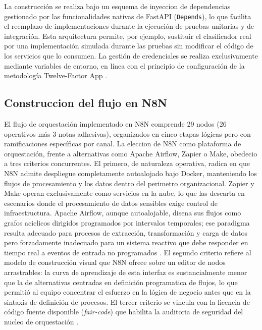 La construcción se realiza bajo un esquema de inyeccion de dependencias gestionado por las funcionalidades nativas de FastAPI (\texttt{Depends}), lo que facilita el reemplazo de implementaciones durante la ejecución de pruebas unitarias y de integración. Esta arquitectura permite, por ejemplo, sustituir el clasificador real por una implementación simulada durante las pruebas sin modificar el código de los servicios que lo consumen. La gestión de credenciales se realiza exclusivamente mediante variables de entorno, en línea con el principio de configuración de la metodología Twelve-Factor App \parencite{Wiggins2017_12factor}.

\subsection{Construccion del flujo en N8N}

El flujo de orquestación implementado en N8N comprende 29 nodos (26 operativos más 3 notas adhesivas), organizados en cinco etapas lógicas pero con ramificaciones específicas por canal. La eleccion de N8N como plataforma de orquestación, frente a alternativas como Apache Airflow, Zapier o Make, obedecio a tres criterios concurrentes. El primero, de naturaleza operativa, radica en que N8N admite despliegue completamente autoalojado bajo Docker, manteniendo los flujos de procesamiento y los datos dentro del perimetro organizacional. Zapier y Make operan exclusivamente como servicios en la nube, lo que las descarta en escenarios donde el procesamiento de datos sensibles exige control de infraestructura. Apache Airflow, aunque autoalojable, disena sus flujos como grafos aciclicos dirigidos programados por intervalos temporales; ese paradigma resulta adecuado para procesos de extracción, transformación y carga de datos pero forzadamente inadecuado para un sistema reactivo que debe responder en tiempo real a eventos de entrada no programados \parencite{Apache2024_airflow}. El segundo criterio refiere al modelo de construcción visual que N8N ofrece sobre un editor de nodos arrastrables: la curva de aprendizaje de esta interfaz es sustancialmente menor que la de alternativas centradas en definición programatica de flujos, lo que permitió al equipo concentrar el esfuerzo en la lógica de negocio antes que en la sintaxis de definición de procesos. El tercer criterio se vincula con la licencia de código fuente disponible (\emph{fair-code}) que habilita la auditoria de seguridad del nucleo de orquestación \parencite{n8n2024_docs}.


